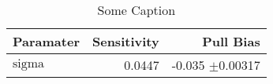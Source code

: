 
\let\oldpm\pm
\renewcommand{\pm}{\ensuremath{\oldpm}}
\begin{table}[h]
\begin{center}
\begin{tabular}{@{}|l|r|r|@{}}
\hline
Paramater & Sensitivity & Pull Bias \\
\hline
$\text{sigma}$ & 0.0447 & -0.035 \pm 0.00317\\
\hline
\end{tabular}
\caption{Some Caption}
\label{thisTable}
\end{center}
\end{table}
\renewcommand{\pm}{\oldpm}

